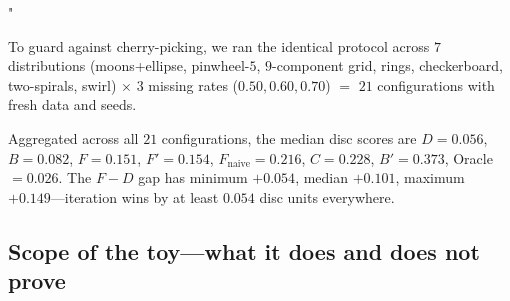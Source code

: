"\documentclass{article}
\theoremstyle{plain}
\theoremstyle{definition}
\theoremstyle{remark}
\begin{document}
To guard against cherry-picking, we ran the identical protocol across $7$ distributions (moons+ellipse, pinwheel-$5$, $9$-component grid, rings, checkerboard, two-spirals, swirl) $\times$ $3$ missing rates ($0.50, 0.60, 0.70$) $=$ $21$ configurations with fresh data and seeds.

\begin{table}[h]
\centering
\caption{Robustness across $21$ configurations. Every pairwise claim in Findings $2$--$5$ is universal.}
\label{tab:toy-robustness}
\end{table}

Aggregated across all $21$ configurations, the median disc scores are $D = 0.056$, $B = 0.082$, $F = 0.151$, $F' = 0.154$, $F_{\mathrm{naive}} = 0.216$, $C = 0.228$, $B' = 0.373$, Oracle $= 0.026$. The $F - D$ gap has minimum $+0.054$, median $+0.101$, maximum $+0.149$---iteration wins by at least $0.054$ disc units everywhere.

\subsection{Scope of the toy---what it does and does not prove}
\end{document}
